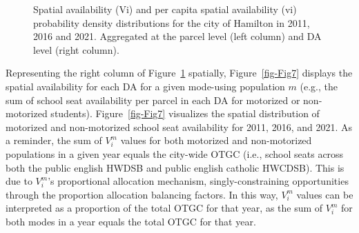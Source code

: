 \documentclass[
default
]{sn-jnl}
\begin{document}
\begin{figure}[H]


\caption{\label{fig-Fig6}Spatial availability (Vi) and per capita
spatial availability (vi) probability density distributions for the city
of Hamilton in 2011, 2016 and 2021. Aggregated at the parcel level (left
column) and DA level (right column).}

\end{figure}%

Representing the right column of Figure~\ref{fig-Fig6} spatially,
Figure~\ref{fig-Fig7} displays the spatial availability for each DA for
a given mode-using population \(m\) (e.g., the sum of school seat
availability per parcel in each DA for motorized or non-motorized
students). Figure~\ref{fig-Fig7} visualizes the spatial distribution of
motorized and non-motorized school seat availability for 2011, 2016, and
2021. As a reminder, the sum of \(V_i^m\) values for both motorized and
non-motorized populations in a given year equals the city-wide OTGC
(i.e., school seats across both the public english HWDSB and public
english catholic HWCDSB). This is due to \(V_i^m\)'s proportional
allocation mechanism, singly-constraining opportunities through the
proportion allocation balancing factors. In this way, \(V_i^m\) values
can be interpreted as a proportion of the total OTGC for that year, as
the sum of \(V_i^m\) for both modes in a year equals the total OTGC for
that year.
\end{document}

